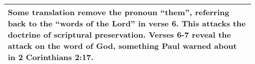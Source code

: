 \begin{mdframed}[style=MyFrame]
\begin{center}
\begin{longtable}{|p{.5in}|p{3.5in}|}
\multicolumn{2}{p{4.3in}}{{Some translation remove the pronoun ``them'', referring back to the ``words of the Lord'' in verse 6. This attacks the doctrine of scriptural preservation. Verses 6-7 reveal the attack on the word of God, something Paul warned about in 2 Corinthians 2:17.}} \\ \hline

\hline

\end{longtable}
\end{center}

\normalsize 
\end{mdframed}



%
%
%
%
%
%
%
%

